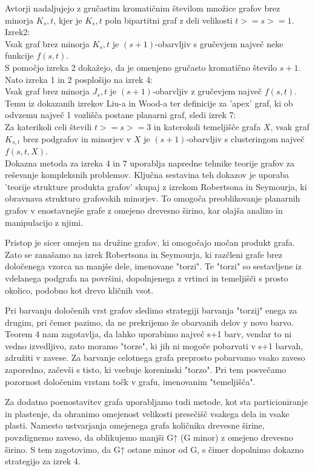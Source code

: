 \documentclass{article}
\begin{document}
Avtorji nadaljujejo z gručastim kromatičnim številom množice grafov brez minorja $K_s,t$, kjer je $K_s,t$ poln bipartitni graf z deli velikosti $t>=s>=1$.\\
Izrek2:\\
Vsak graf brez minorja $K_s,t$ je $(s+1)$-obarvljiv s gručevjem največ neke funkcije $f(s,t)$.\\
S pomočjo izreka 2 dokažejo, da je omenjeno gručasto kromatično število $s+1$.
\\
Nato izreka 1 in 2 posplošijo na izrek 4:\\
Vsak graf brez minorja $J_s,t$ je $(s+1)$-obarvljiv z gručevjem največ $f(s, t)$.
\\
Temu iz dokazanih izrekov Liu-a in Wood-a ter definicije za 'apex' graf, ki ob odvzemu največ 1 vozlišča postane planarni graf, sledi izrek 7:\\
Za katerikoli celi števili $t >= s >= 3$ in katerokoli temeljišče grafa $X$, vsak graf $K_{s,t}$ brez podgrafov in minorjev v $X$ je $(s + 1)$-obarvljiv s clusteringom največ $f(s, t, X)$.\\

Dokazna metoda za izreka 4 in 7 uporablja napredne tehnike teorije grafov za reševanje kompleksnih problemov. Ključna sestavina teh dokazov je uporaba 'teorije strukture produkta grafov' skupaj z izrekom Robertsona in Seymourja, ki obravnava strukturo grafovskih minorjev. To omogoča preoblikovanje planarnih grafov v enostavnejše grafe z omejeno drevesno širino, kar olajša analizo in manipulacijo z njimi.

Pristop je sicer omejen na družine grafov, ki omogočajo močan produkt grafa. Zato se zanašamo na izrek Robertsona in Seymourja, ki razčleni grafe brez določenega vzorca na manjše dele, imenovane "torzi". Te "torzi" so sestavljene iz vdelanega podgrafa na površini, dopolnjenega z vrtinci in temeljišči s prosto okolico, podobno kot drevo kličnih vsot.


Pri barvanju določenih vrst grafov sledimo strategiji barvanja "torzij" enega za drugim, pri čemer pazimo, da ne prekrijemo že obarvanih delov y novo barvo. Teorem 4 nam zagotavlja, da lahko uporabimo največ s+1 barv, vendar to ni vedno izvedljivo, zato moramo "torze", ki jih ni mogoče pobarvati v s+1 barvah, združiti v zavese. Za barvanje celotnega grafa preprosto pobarvamo vsako zaveso zaporedno, začevši s tisto, ki vsebuje koreninski "torzo". Pri tem posvečamo pozornost določenim vrstam točk v grafu, imenovanim "temeljišča".

Za dodatno poenostavitev grafa uporabljamo tudi metode, kot sta particioniranje in plastenje, da ohranimo omejenost velikosti presečišč vsakega dela in vsake plasti. Namesto ustvarjanja omejenega grafa količnika drevesne širine, povzdignemo zaveso, da oblikujemo manjši G↑ (G minor) z omejeno drevesno širino. S tem zagotovimo, da G↑ ostane minor od G, s čimer dopolnimo dokazno strategijo za izrek 4.
\end{document}
